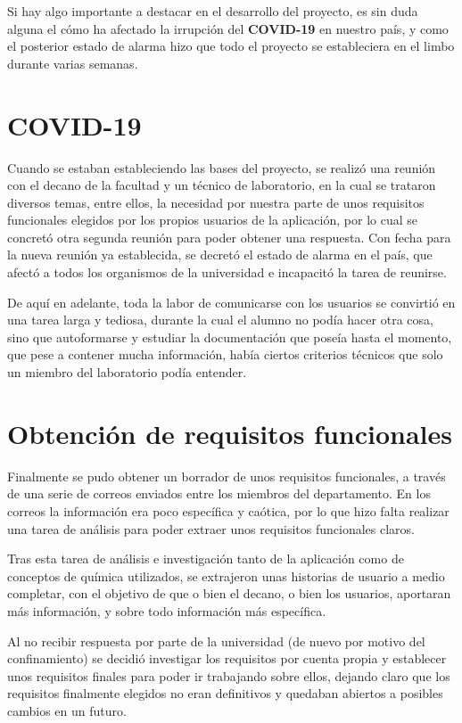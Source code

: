
Si hay algo importante a destacar en el desarrollo del proyecto, es sin duda alguna el cómo ha afectado la irrupción del \textbf{COVID-19} en nuestro país, y como el posterior estado de alarma hizo que todo el proyecto se estableciera en el limbo durante varias semanas.

\section{COVID-19}

Cuando se estaban estableciendo las bases del proyecto, se realizó una reunión con el decano de la facultad y un técnico de laboratorio, en la cual se trataron diversos temas, entre ellos, la necesidad por nuestra parte de unos requisitos funcionales elegidos por los propios usuarios de la aplicación, por lo cual se concretó otra segunda reunión para poder obtener una respuesta. Con fecha para la nueva reunión ya establecida, se decretó el estado de alarma en el país, que afectó a todos los organismos de la universidad e incapacitó la tarea de reunirse. 

De aquí en adelante, toda la labor de comunicarse con los usuarios se convirtió en una tarea larga y tediosa, durante la cual el alumno no podía hacer otra cosa, sino que autoformarse y estudiar la documentación que poseía hasta el momento, que pese a contener mucha información, había ciertos criterios técnicos que solo un miembro del laboratorio podía entender.

\section{Obtención de requisitos funcionales}

Finalmente se pudo obtener un borrador de unos requisitos funcionales, a través de una serie de correos enviados entre los miembros del departamento. En los correos la información era poco específica y caótica, por lo que hizo falta realizar una tarea de análisis para poder extraer unos requisitos funcionales claros. 

Tras esta tarea de análisis e investigación tanto de la aplicación como de conceptos de química utilizados, se extrajeron unas historias de usuario a medio completar, con el objetivo de que o bien el decano, o bien los usuarios, aportaran más información, y sobre todo información más específica. 

Al no recibir respuesta por parte de la universidad (de nuevo por motivo del confinamiento) se decidió investigar los requisitos por cuenta propia y establecer unos requisitos finales para poder ir trabajando sobre ellos, dejando claro que los requisitos finalmente elegidos no eran definitivos y quedaban abiertos a posibles cambios en un futuro.

